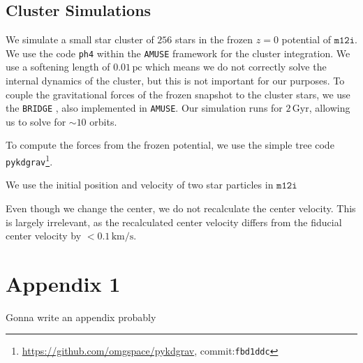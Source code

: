 \documentclass[twocolumn]{aastex62}
\newcommand{\pc}{\text{pc}}
\newcommand{\Gyr}{\text{Gyr}}
\newcommand{\kms}{\text{km}/\text{s}}
\newcommand{\z}{z}
\begin{document}
\subsection{Cluster Simulations} \label{ssec:cluster_sim}
We simulate a small star cluster of $256$ stars in the frozen $\z=0$
potential of $\texttt{m12i}$. We use the code \texttt{ph4} within the
\texttt{AMUSE} framework \citep{2011ascl.soft07007P, 2013CoPhC.184..456P,
2013A&A...557A..84P} for the cluster integration. We use a softening length
of $0.01\,\pc$ which means we do not correctly solve the internal dynamics of
the cluster, but this is not important for our purposes. To couple the
gravitational forces of the frozen snapshot to the cluster stars, we use the
\texttt{BRIDGE} \citep{2007PASJ...59.1095F}, also implemented in
\texttt{AMUSE}. Our simulation runs for $2\,\Gyr$, allowing us to solve for
$\sim 10$ orbits.

To compute the forces from the frozen potential, we use the simple tree code
\texttt{pykdgrav}\footnote{\url{https://github.com/omgspace/pykdgrav},
commit:\texttt{fbd1ddc}}. 

We use the initial position and velocity of two star particles in
$\texttt{m12i}$

Even though we change the center, we do not recalculate the center velocity.
This is largely irrelevant, as the recalculated center velocity differs from
the fiducial center velocity by $<0.1\,\kms$.

\appendix \section{Appendix 1}
Gonna write an appendix probably 


\end{document}
